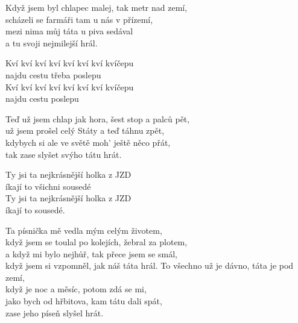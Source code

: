 \ve{}
Když jsem byl chlapec malej, tak metr nad zemí,\\
   scházeli se farmáři tam u nás v přízemí,\\
   mezi nima můj táta u piva sedával\\
    a tu svoji nejmilejší hrál.\quad

\cho{}
Kví kví kví kví kví kví kví kvíčepu \\
najdu cestu třeba poslepu\\
Kví kví kví kví kví kví kví kvíčepu \\
najdu cestu poslepu

\ve{}
Teď už jsem chlap jak hora, šest stop a palců pět, \\
už jsem prošel celý Státy a teď táhnu zpět, \\
kdybych si ale ve světě moh' ještě něco přát, \\
tak zase slyšet svýho tátu hrát. 

\cho{}
Ty jsi ta nejkrásnější holka z JZD\\
íkají to všichni sousedé\\
Ty jsi ta nejkrásnější holka z JZD\\
íkají to sousedé.

\ve{}
Ta písnička mě vedla mým celým životem, \\
když jsem se toulal po kolejích, žebral za plotem, \\
a když mi bylo nejhůř, tak přece jsem se smál, \\
když jsem si vzpomněl, jak náš táta hrál. 
\cho{}
\ve{}
To všechno už je dávno, táta je pod zemí, \\
když je noc a měsíc, potom zdá se mi,\\ 
jako bych od hřbitova, kam tátu dali spát, \\
zase jeho píseň slyšel hrát.





\esong{}